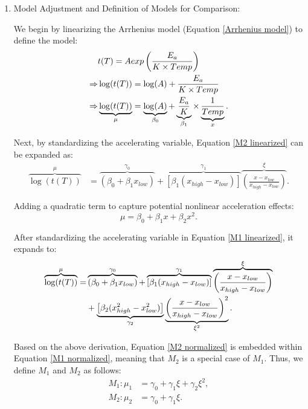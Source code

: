 \begin{enumerate}
\renewcommand{\labelenumi}{\Roman{enumi}.}

\item Model Adjustment and Definition of Models for Comparison:

We begin by linearizing the Arrhenius model (Equation \eqref{Arrhenius model}) to define the model:
\begin{align}
&t(T)=Aexp\left( \frac{E_a}{K \times Temp} \right)\notag \\ 
\Rightarrow&\log(t(T))=\log(A)+\frac{E_a}{K \times Temp}\notag \\ 
\Rightarrow&\underbrace{\log(t(T))}_{\mu}=\underbrace{\log(A)}_{\beta_0}+\underbrace{\frac{E_a}{K}}_{\beta_1} \times \underbrace{\frac{1}{Temp}}_x. \label{M2 linearized}
\end{align}

Next, by standardizing the accelerating variable, Equation \eqref{M2 linearized} can be expanded as:
\begin{align}
\overbrace{\log(t(T))}^{\mu}&=\overbrace{(\beta_0+\beta_1 x_{low})}^{\gamma_0}+\overbrace{\left[\beta_1(x_{high}-x_{low})\right]}^{\gamma_1}\overbrace{\left( \frac{x-x_{low}}{x_{high}-x_{low}}\right)}^{\xi}. \label{M2 normalized}
\end{align}

Adding a quadratic term to capture potential nonlinear acceleration effects:
\begin{equation} \label{M1 linearized}
\mu =\beta_0+\beta_1x+\beta_2x^2.
\end{equation}

After standardizing the accelerating variable in Equation \eqref{M1 linearized}, it expands to:
\begin{align}
\overbrace{\log(t(T))}^{\mu}=&\overbrace{(\beta_0+\beta_1 x_{low})}^{\gamma_0}+\overbrace{\left[\beta_1(x_{high}-x_{low})\right]}^{\gamma_1}\overbrace{\left( \frac{x-x_{low}}{x_{high}-x_{low}}\right)}^{\xi} \notag \\
&+\underbrace{\left[\beta_2 (x_{high}^2-x_{low}^2) \right]}_{\gamma_2}\underbrace{\left( \frac{x-x_{low}}{x_{high}-x_{low}}\right)^2}_{\xi^2}. \label{M1 normalized}
\end{align}

Based on the above derivation, Equation \eqref{M2 normalized} is embedded within Equation \eqref{M1 normalized}, meaning that $M_2$ is a special case of $M_1$. Thus, we define $M_1$ and $M_2$ as follows:
\begin{align}
M_1:\mu_1&=\gamma_0+\gamma_1 \xi +\gamma_2 \xi^2,   \label{Final M1 normalized} \\
M_2:\mu_2&=\gamma_0+\gamma_1 \xi.   \label{Final M2 normalized}
\end{align}


\end{enumerate}
